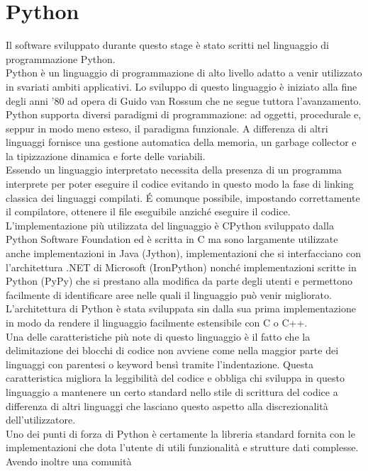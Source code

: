 \documentclass[italian,12pt]{book}
\begin{document}
\section{Python}
Il software sviluppato durante questo stage è stato scritti nel linguaggio di programmazione
Python.\\
Python è un linguaggio di programmazione di alto livello adatto a venir utilizzato in svariati
ambiti applicativi. Lo sviluppo di questo linguaggio è iniziato alla fine degli anni '80 ad opera 
di Guido van Rossum che ne segue tuttora l'avanzamento. \\
Python supporta diversi paradigmi di programmazione: ad oggetti, procedurale e, seppur in 
modo meno esteso, il paradigma funzionale. A differenza di altri linguaggi fornisce una gestione
automatica della memoria, un garbage collector e la tipizzazione dinamica e forte delle variabili. \\
Essendo un linguaggio interpretato necessita della presenza di un programma interprete per 
poter eseguire il codice evitando in questo modo la fase di linking classica dei linguaggi compilati.
\'E comunque possibile, impostando correttamente il compilatore, ottenere il file eseguibile 
anziché eseguire il codice. \\
L'implementazione più utilizzata del linguaggio è CPython sviluppato
dalla Python Software Foundation ed è scritta in C ma sono largamente utilizzate anche 
implementazioni in Java (Jython), implementazioni che si interfacciano con l'architettura 
.NET di Microsoft (IronPython) nonché implementazioni scritte in Python (PyPy) che si prestano
alla modifica da parte degli utenti e permettono 
facilmente di identificare aree nelle quali il linguaggio può venir migliorato. L'architettura di
Python è stata sviluppata sin dalla sua prima implementazione in modo da 
rendere il linguaggio facilmente estensibile con C o C++. \\
Una delle caratteristiche più note di questo linguaggio è il fatto che la delimitazione dei 
blocchi di codice non avviene come nella maggior parte dei linguaggi con parentesi
o keyword bensì tramite l'indentazione. Questa caratteristica migliora la leggibilità del codice
e obbliga chi sviluppa in questo linguaggio a mantenere un certo standard nello stile di 
scrittura del codice a differenza di altri linguaggi che lasciano questo aspetto alla discrezionalità 
dell'utilizzatore. \\
Uno dei punti di forza di Python è certamente la libreria standard fornita con le implementazioni 
che dota l'utente di utili funzionalità e strutture dati complesse.  Avendo inoltre una comunità 
\end{document}
